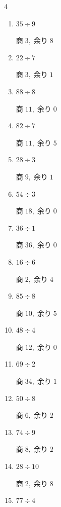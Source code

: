 \begin{multicols}{4}
\begin{enumerate}
        $商\; 3,\; 余り\; 1$

  \item $35 \div 9$

        $商\; 3,\; 余り\; 8$

  \item $22 \div 7$

        $商\; 3,\; 余り\; 1$

  \item $88 \div 8$

        $商\; 11,\; 余り\; 0$

\columnbreak %

  \item $82 \div 7$

        $商\; 11,\; 余り\; 5$

  \item $28 \div 3$

        $商\; 9,\; 余り\; 1$

  \item $54 \div 3$

        $商\; 18,\; 余り\; 0$

  \item $36 \div 1$

        $商\; 36,\; 余り\; 0$

  \item $16 \div 6$

        $商\; 2,\; 余り\; 4$

  \item $85 \div 8$

        $商\; 10,\; 余り\; 5$

  \item $48 \div 4$

        $商\; 12,\; 余り\; 0$

  \item $69 \div 2$

        $商\; 34,\; 余り\; 1$

  \item $50 \div 8$

        $商\; 6,\; 余り\; 2$

  \item $74 \div 9$

        $商\; 8,\; 余り\; 2$

  \item $28 \div 10$

        $商\; 2,\; 余り\; 8$

  \item $77 \div 4$


\end{enumerate}
\end{multicols}
